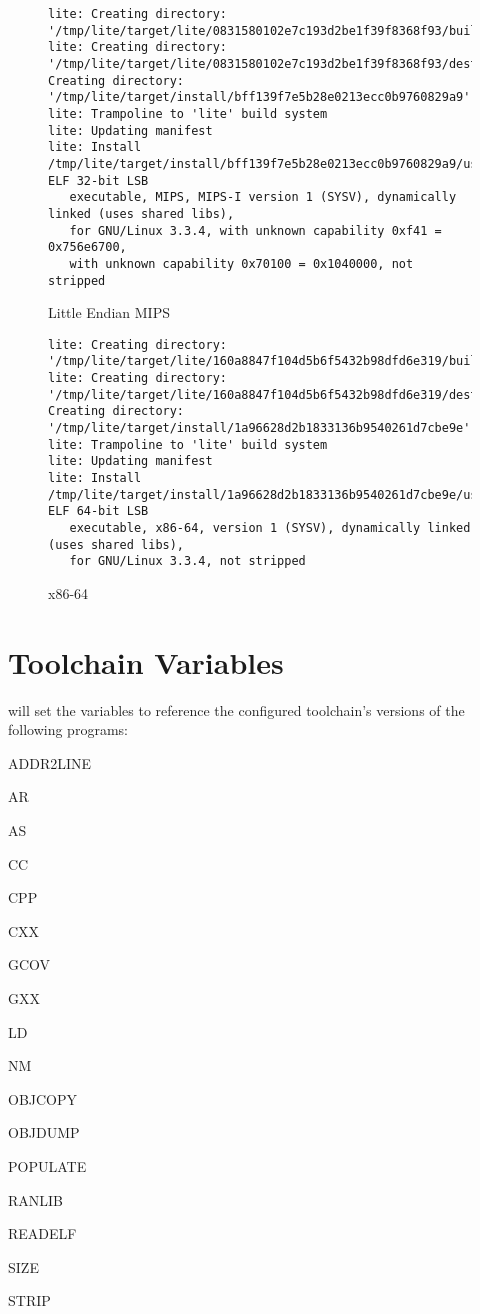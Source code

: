 \begin{figure}[p]
\begin{scriptsize}
\begin{verbatim}
lite: Creating directory: '/tmp/lite/target/lite/0831580102e7c193d2be1f39f8368f93/build'
lite: Creating directory: '/tmp/lite/target/lite/0831580102e7c193d2be1f39f8368f93/destdir'
Creating directory: '/tmp/lite/target/install/bff139f7e5b28e0213ecc0b9760829a9'
lite: Trampoline to 'lite' build system
lite: Updating manifest
lite: Install
/tmp/lite/target/install/bff139f7e5b28e0213ecc0b9760829a9/usr/bin/lite: ELF 32-bit LSB
   executable, MIPS, MIPS-I version 1 (SYSV), dynamically linked (uses shared libs),
   for GNU/Linux 3.3.4, with unknown capability 0xf41 = 0x756e6700,
   with unknown capability 0x70100 = 0x1040000, not stripped
\end{verbatim}
\end{scriptsize}
\caption{Little Endian MIPS}\label{toolchain-usage:le-mips}
\end{figure}


\begin{figure}[p]
\begin{scriptsize}
\begin{verbatim}
lite: Creating directory: '/tmp/lite/target/lite/160a8847f104d5b6f5432b98dfd6e319/build'
lite: Creating directory: '/tmp/lite/target/lite/160a8847f104d5b6f5432b98dfd6e319/destdir'
Creating directory: '/tmp/lite/target/install/1a96628d2b1833136b9540261d7cbe9e'
lite: Trampoline to 'lite' build system
lite: Updating manifest
lite: Install
/tmp/lite/target/install/1a96628d2b1833136b9540261d7cbe9e/usr/bin/lite: ELF 64-bit LSB
   executable, x86-64, version 1 (SYSV), dynamically linked (uses shared libs),
   for GNU/Linux 3.3.4, not stripped
\end{verbatim}
\end{scriptsize}
\caption{x86-64}\label{toolchain-usage:x86-64}
\end{figure}



\section{Toolchain Variables}

\lmsbw will set the \makefile variables to reference the configured
toolchain's versions of the following programs:

\begin{description}
\item{ADDR2LINE}
\item{AR}
\item{AS}
\item{CC}
\item{CPP}
\item{CXX}
\item{GCOV}
\item{GXX}
\item{LD}
\item{NM}
\item{OBJCOPY}
\item{OBJDUMP}
\item{POPULATE}
\item{RANLIB}
\item{READELF}
\item{SIZE}
\item{STRIP}
\end{description}


